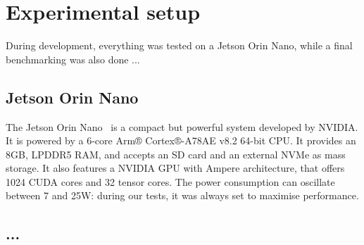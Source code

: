 \chapter{Experimental setup}
\label{chap:experim-setup}

During development, everything was tested on a Jetson Orin Nano, while a final benchmarking was also done ...

\section{Jetson Orin Nano}

The Jetson Orin Nano~\cite{jetson} is a compact but powerful system developed by NVIDIA.
It is powered by a 6-core Arm® Cortex®-A78AE v8.2 64-bit CPU.
It provides an 8GB, LPDDR5 RAM, and accepts an SD card and an external NVMe as mass storage.
It also features a NVIDIA GPU with Ampere architecture, that offers 1024 CUDA cores and 32 tensor cores.
The power consumption can oscillate between 7 and 25W: during our tests, it was always set to maximise performance. 

\section{...}

